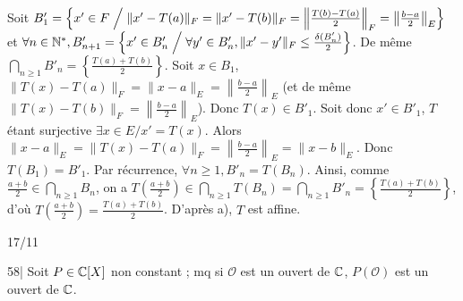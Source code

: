 \begin{solution}
Soit $B'_1 = \left\{ x' \in F \;\middle/\; \|x' - T(a)\|_F = \|x' - T(b)\|_F = \left\|\frac{T(b) - T(a)}{2}\right\|_F = \left\|\frac{b - a}{2}\right\|_E \right\}$
et $\forall n \in \mathbb N^*, B'_{n+1} = \left\{ x' \in B'_n \;\middle/\; \forall y' \in B'_n, \|x' - y'\|_F \leq \frac{\delta(B'_n)}{2} \right\}$.
De même $\bigcap_{n \geq 1} B'_n = \left\{\frac{T(a) + T(b)}{2}\right\}$.
Soit $x \in B_1$, $\|T(x) - T(a)\|_F = \|x - a\|_E = \left\|\frac{b - a}{2}\right\|_E$ (et de même $\|T(x) - T(b)\|_F = \left\|\frac{b - a}{2}\right\|_E$). Donc $T(x) \in B'_1$.
Soit donc $x' \in B'_1$, $T$ étant surjective $\exists x \in E / x' = T(x)$. Alors $\|x - a\|_E = \|T(x) - T(a)\|_F = \left\|\frac{b - a}{2}\right\|_E = \|x - b\|_E$.
Donc $T(B_1) = B'_1$.
Par récurrence, $\forall n \geq 1, B'_n = T(B_n)$.
Ainsi, comme $\frac{a + b}{2} \in \bigcap_{n \geq 1} B_n$, on a $T\left(\frac{a + b}{2}\right) \in \bigcap_{n \geq 1} T(B_n) = \bigcap_{n \geq 1} B'_n = \left\{\frac{T(a) + T(b)}{2}\right\}$, d'où $\boxed{T\left(\frac{a + b}{2}\right) = \frac{T(a) + T(b)}{2}}$.
D'après a), $T$ est affine.
\end{solution}


\begin{statementbox}
17/11

58| Soit $P \in \mathbb C[X]$ non constant ; mq si $\mathcal{O}$ est un ouvert de $\mathbb C$, $P(\mathcal{O})$ est un ouvert de $\mathbb C$.
\end{statementbox}

